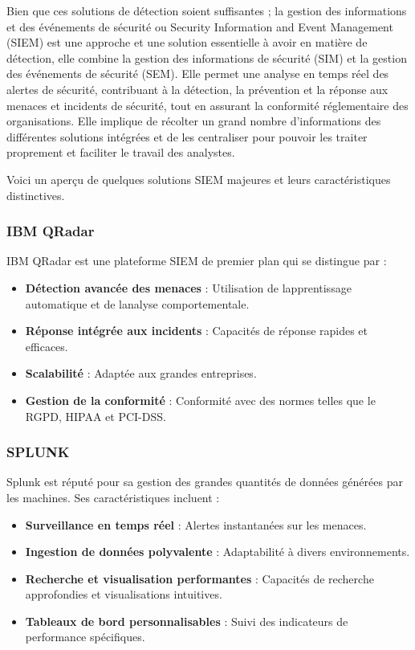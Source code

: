 \documentclass[
  11pt,
  a4paper,
  krantz2,
  11pt,
  oneside]{krantz}
\begin{document}
Bien que ces solutions de détection soient suffisantes ; la gestion des informations et des événements de sécurité ou Security Information and Event Management (SIEM) est une approche et une solution essentielle à avoir en matière de détection, elle combine la gestion des informations de sécurité (SIM) et la gestion des événements de sécurité (SEM). Elle permet une analyse en temps réel des alertes de sécurité, contribuant à la détection, la prévention et la réponse aux menaces et incidents de sécurité, tout en assurant la conformité réglementaire des organisations. Elle implique de récolter un grand nombre d'informations des différentes solutions intégrées et de les centraliser pour pouvoir les traiter proprement et faciliter le travail des analystes.

Voici un aperçu de quelques solutions SIEM majeures et leurs caractéristiques distinctives.

\subsubsection{IBM QRadar}\label{ibm-qradar}

IBM QRadar est une plateforme SIEM de premier plan qui se distingue par :

\begin{itemize}
\item
  \textbf{Détection avancée des menaces} : Utilisation de l\textquotesingle apprentissage automatique et de l\textquotesingle analyse comportementale.
\item
  \textbf{Réponse intégrée aux incidents} : Capacités de réponse rapides et efficaces.
\item
  \textbf{Scalabilité} : Adaptée aux grandes entreprises.
\item
  \textbf{Gestion de la conformité} : Conformité avec des normes telles que le RGPD, HIPAA et PCI-DSS.
\end{itemize}

\subsubsection{SPLUNK}\label{splunk}

Splunk est réputé pour sa gestion des grandes quantités de données générées par les machines. Ses caractéristiques incluent :

\begin{itemize}
\item
  \textbf{Surveillance en temps réel} : Alertes instantanées sur les menaces.
\item
  \textbf{Ingestion de données polyvalente} : Adaptabilité à divers environnements.
\item
  \textbf{Recherche et visualisation performantes} : Capacités de recherche approfondies et visualisations intuitives.
\item
  \textbf{Tableaux de bord personnalisables} : Suivi des indicateurs de performance spécifiques.
\end{itemize}
\end{document}
